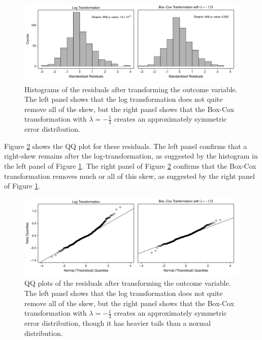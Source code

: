 \documentclass[12pt]{article}
\begin{document}
\begin{figure}[h!]
\begin{center}
\includegraphics[width = \textwidth]{figs/cg-trans-residuals-hist.pdf}
\caption{Histograms of the residuals after transforming the outcome variable. The left panel shows that the log transformation does not quite remove all of the skew, but the right panel shows that the Box-Cox transformation with $\lambda = -\frac{1}{3}$ creates an approximately symmetric error distribution.}\label{fig:cg-trans-residuals-hist}
\end{center}
\end{figure}

Figure \ref{fig:cg-trans-qq-plot} shows the QQ plot for these residuals. The left panel confirms that a right-skew remains after the log-transformation, as suggested by the histogram in the left panel of Figure \ref{fig:cg-trans-residuals-hist}. The right panel of Figure \ref{fig:cg-trans-qq-plot} confirms that the Box-Cox transformation removes much or all of this skew, as suggested by the right panel of Figure \ref{fig:cg-trans-residuals-hist}. 

\begin{figure}[h!]
\begin{center}
\includegraphics[width = \textwidth]{figs/cg-trans-qq-plot.pdf}
\caption{QQ plots of the residuals after transforming the outcome variable. The left panel shows that the log transformation does not quite remove all of the skew, but the right panel shows that the Box-Cox transformation with $\lambda = -\frac{1}{3}$ creates an approximately symmetric error distribution, though it has heavier tails than a normal distribution.}\label{fig:cg-trans-qq-plot}
\end{center}
\end{figure}
\end{document}
